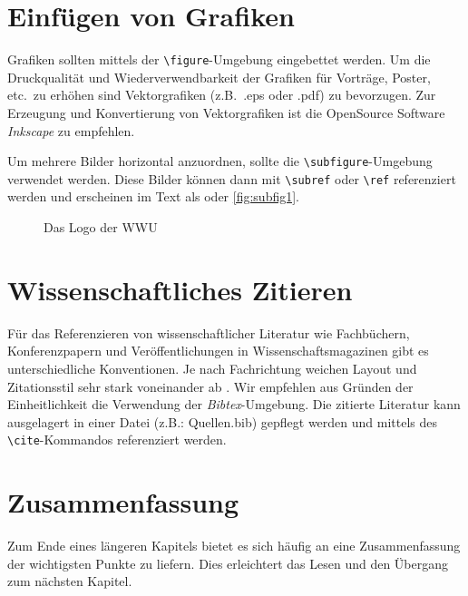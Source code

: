 \section{Einfügen von Grafiken}
\label{s:grafik} 
Grafiken sollten mittels der \verb+\figure+-Umgebung eingebettet werden. Um die Druckqualität und Wiederverwendbarkeit der Grafiken für Vorträge, Poster, etc.\ zu erhöhen sind Vektorgrafiken (z.B.\ .eps oder .pdf) zu bevorzugen. Zur Erzeugung und Konvertierung von Vektorgrafiken ist die OpenSource Software \emph{Inkscape} zu empfehlen.

Um mehrere Bilder horizontal anzuordnen, sollte die \verb+\subfigure+-Umgebung verwendet werden. Diese Bilder können dann mit \verb+\subref+ oder \verb+\ref+ referenziert werden und erscheinen im Text als  oder \ref{fig:subfig1}.

\begin{figure}
\begin{center}
\end{center}
\caption{Das Logo der WWU}
\label{fig:histogram}
\end{figure}


\section{Wissenschaftliches Zitieren}
\label{s:zitat}
Für das Referenzieren von wissenschaftlicher Literatur wie Fachbüchern, Konferenzpapern und Veröffentlichungen in Wissenschaftsmagazinen gibt es unterschiedliche Konventionen. Je nach Fachrichtung weichen Layout und Zitationsstil sehr stark voneinander ab \cite{jele2010}. Wir empfehlen aus Gründen der Einheitlichkeit die Verwendung der \emph{Bibtex}-Umgebung. Die zitierte Literatur kann ausgelagert in einer Datei (z.B.: Quellen.bib) gepflegt werden und mittels des \verb+\cite+-Kommandos referenziert werden.


\section{Zusammenfassung}
\label{s:zusammenfassung}
Zum Ende eines längeren Kapitels bietet es sich häufig an eine Zusammenfassung der wichtigsten Punkte zu liefern. Dies erleichtert das Lesen und den Übergang zum nächsten Kapitel.
